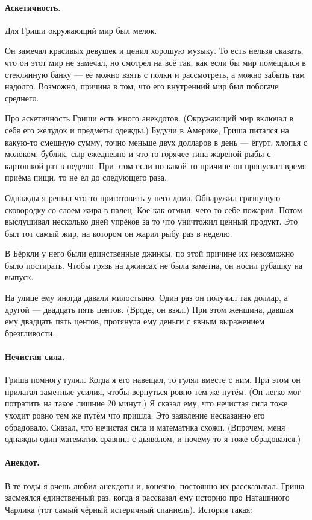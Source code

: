 \documentclass{book}
\begin{document}
\paragraph{Аскетичность.}
Для Гриши  окружающий мир был мелок.

Он замечал красивых девушек и ценил хорошую музыку.
То есть нельзя сказать, что он этот мир не замечал, но смотрел на всё так, как если бы мир помещался в стеклянную банку --- её можно взять с полки и рассмотреть, а можно забыть там надолго.
Возможно, причина в том, что его внутренний мир был побогаче среднего.

Про аскетичность Гриши есть много анекдотов.
(Окружающий мир включал в себя его желудок и предметы одежды.)
Будучи в Америке, Гриша питался на какую-то смешную сумму, точно меньше двух долларов в день --- ёгурт, хлопья с молоком, бублик, сыр ежедневно и что-то горячее типа жареной рыбы с картошкой раз в неделю.
При этом если по какой-то причине он пропускал время приёма пищи, то не ел до следующего раза.

Однажды я решил что-то приготовить у него дома.
Обнаружил грязнущую сковородку со слоем жира в палец.
Кое-как отмыл, чего-то себе пожарил.
Потом выслушивал несколько дней упрёков за то что уничтожил ценный продукт.
Это был тот самый жир, на котором он жарил рыбу раз в неделю.

В Бёркли у него были единственные джинсы, по этой причине их невозможно было постирать.
Чтобы грязь на джинсах не была заметна, он носил рубашку на выпуск.

На улице ему иногда давали милостыню.
Один раз он получил так доллар, а другой --- двадцать пять центов.
(Вроде, он взял.)
При этом женщина, давшая ему двадцать пять центов, протянула ему деньги с явным выражением брезгливости.


\paragraph{Нечистая сила.}
Гриша помногу гулял.
Когда я его навещал, то гулял вместе с ним.
При этом он прилагал заметные усилия, чтобы вернуться ровно тем же путём.
(Он легко мог потратить на такое лишние 20 минут.)
Я сказал ему, что нечистая сила тоже уходит ровно тем же путём что пришла.
Это заявление несказанно его обрадовало.
Сказал, что нечистая сила и математика схожи.
(Впрочем, меня однажды один математик сравнил с дьяволом, и почему-то я тоже обрадовался.)

\paragraph{Анекдот.}
В те годы я очень любил анекдоты и, конечно, постоянно их рассказывал.
Гриша засмеялся единственный раз, когда я рассказал ему историю про Наташиного Чарлика (тот самый чёрный истеричный спаниель).
История такая:
\end{document}
